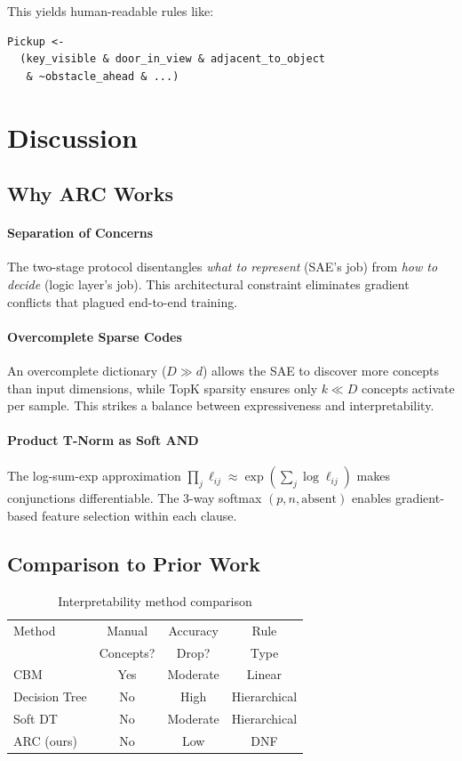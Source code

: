 \documentclass[11pt,twocolumn]{article}
\begin{document}
This yields human-readable rules like:
\begin{verbatim}
Pickup <-
  (key_visible & door_in_view & adjacent_to_object
   & ~obstacle_ahead & ...)
\end{verbatim}

\section{Discussion}

\subsection{Why ARC Works}

\paragraph{Separation of Concerns} The two-stage protocol disentangles \emph{what to represent} (SAE's job) from \emph{how to decide} (logic layer's job). This architectural constraint eliminates gradient conflicts that plagued end-to-end training.

\paragraph{Overcomplete Sparse Codes} An overcomplete dictionary ($D \gg d$) allows the SAE to discover more concepts than input dimensions, while TopK sparsity ensures only $k \ll D$ concepts activate per sample. This strikes a balance between expressiveness and interpretability.

\paragraph{Product T-Norm as Soft AND} The log-sum-exp approximation $\prod_j \ell_{ij} \approx \exp(\sum_j \log \ell_{ij})$ makes conjunctions differentiable. The 3-way softmax $(p, n, \text{absent})$ enables gradient-based feature selection within each clause.

\subsection{Comparison to Prior Work}

\begin{table}[h]
\centering
\caption{Interpretability method comparison}
\small
\begin{tabular}{lccc}
\toprule
Method & Manual & Accuracy & Rule \\
 & Concepts? & Drop? & Type \\
\midrule
CBM \cite{koh2020concept} & Yes & Moderate & Linear \\
Decision Tree & No & High & Hierarchical \\
Soft DT \cite{frosst2017distilling} & No & Moderate & Hierarchical \\
ARC (ours) & No & Low & DNF \\
\bottomrule
\end{tabular}
\end{table}
\end{document}
